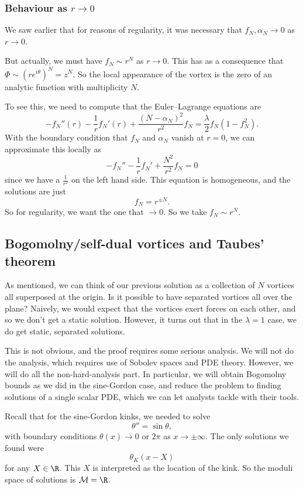 \documentclass[a4paper]{article}
\begin{document}
\subsubsection*{Behaviour as $r \to 0$}
We saw earlier that for reasons of regularity, it was necessary that $f_N, \alpha_N \to 0$ as $r \to 0$.

But actually, we must have $f_N \sim r^N$ as $r \to 0$. This has as a consequence that $\Phi \sim (r e^{i\theta})^N = z^N$. So the local appearance of the vortex is the zero of an analytic function with multiplicity $N$.

To see this, we need to compute that the Euler--Lagrange equations are
\[
  -f_N''(r) - \frac{1}{r} f_N'(r) + \frac{(N - \alpha_N)^2}{r^2} f_N = \frac{\lambda}{2} f_N(1 - f_N^2).
\]
With the boundary condition that $f_N$ and $\alpha_N$ vanish at $r = 0$, we can approximate this locally as
\[
  - f_N'' - \frac{1}{r} f_N' + \frac{N^2}{r^2} f_N = 0
\]
since we have a $\frac{1}{r^2}$ on the left hand side. This equation is homogeneous, and the solutions are just
\[
  f_N = r^{\pm N}.
\]
So for regularity, we want the one that $\to 0$. So we take $f_N \sim r^N$.

\subsection{Bogomolny/self-dual vortices and Taubes' theorem}
As mentioned, we can think of our previous solution as a collection of $N$ vortices all superposed at the origin. Is it possible to have separated vortices all over the plane? Naively, we would expect that the vortices exert forces on each other, and so we don't get a static solution. However, it turns out that in the $\lambda = 1$ case, we do get static, separated solutions.

This is not obvious, and the proof requires some serious analysis. We will not do the analysis, which requires use of Sobolev spaces and PDE theory. However, we will do all the non-hard-analysis part. In particular, we will obtain Bogomolny bounds as we did in the sine-Gordon case, and reduce the problem to finding solutions of a single scalar PDE, which we can let analysts tackle with their tools.

Recall that for the sine-Gordon kinks, we needed to solve
\[
  \theta'' = \sin \theta,
\]
with boundary conditions $\theta(x) \to 0$ or $2\pi$ as $x \to \pm \infty$. The only solutions we found were
\[
  \theta_K (x - X)
\]
for any $X \in \R$. This $X$ is interpreted as the location of the kink. So the moduli space of solutions is $\mathcal{M} = \R$.
\end{document}

